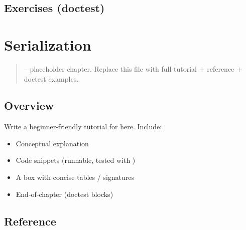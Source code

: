\documentclass[a4paper,11pt,english]{sphinxmanual}
\begin{document}
\subsection{Exercises (doctest)}
\label{\detokenize{stdlib/files_paths:exercises-doctest}}
\begin{sphinxVerbatim}[commandchars=\\\{\}]
\end{sphinxVerbatim}

\sphinxstepscope


\section{Serialization}
\label{\detokenize{stdlib/serialization:serialization}}\label{\detokenize{stdlib/serialization::doc}}\begin{quote}

\sphinxAtStartPar
{} – placeholder chapter. Replace this file with full tutorial + reference + doctest examples.
\end{quote}


\subsection{Overview}
\label{\detokenize{stdlib/serialization:overview}}
\sphinxAtStartPar
Write a beginner‑friendly tutorial for  here. Include:
\begin{itemize}
\item {} 
\sphinxAtStartPar
Conceptual explanation

\item {} 
\sphinxAtStartPar
Code snippets (runnable, tested with )

\item {} 
\sphinxAtStartPar
A  box with concise tables / signatures

\item {} 
\sphinxAtStartPar
End‑of‑chapter  (doctest blocks)

\end{itemize}


\subsection{Reference}
\label{\detokenize{stdlib/serialization:reference}}
\end{document}
